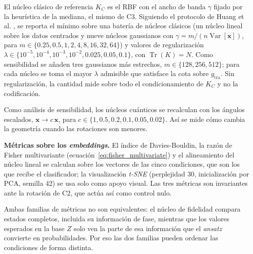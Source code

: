 El núcleo clásico de referencia $K_C$ es el RBF con el ancho de banda $\gamma$ fijado por la
heurística de la mediana, el mismo de C3. Siguiendo el protocolo de Huang et al. \cite{huang2021power},
se reporta el mínimo sobre una batería de núcleos clásicos (un núcleo lineal sobre los datos
centrados y nueve núcleos gaussianos con $\gamma = m/(n\operatorname{Var}[\mathbf{x}])$, para
$m\in\{0.25,0.5,1,2,4,8,16,32,64\}$) y valores de regularización
$\lambda\in\{10^{-5},10^{-4},10^{-3},10^{-2},0.025,0.05,0.1\}$, con $\operatorname{Tr}(K) = N$. Como
sensibilidad se añaden tres gaussianos más estrechos, $m\in\{128,256,512\}$;
para cada núcleo se toma el mayor $\lambda$ admisible que satisface la cota sobre $g_{\mathrm{tra}}$.
Sin regularización, la cantidad mide sobre todo el condicionamiento de $K_C$ y no la codificación.

Como análisis de sensibilidad, los núcleos cuánticos se recalculan con los ángulos escalados,
$\mathbf{x}\to c\,\mathbf{x}$, para $c \in \{1, 0.5, 0.2, 0.1, 0.05, 0.02\}$. Así se mide cómo cambia la
geometría cuando las rotaciones son menores.

\textbf{Métricas sobre los \textit{embeddings}.} El índice de Davies-Bouldin, la razón de
Fisher multivariante (ecuación~\eqref{eq:fisher_multivariate}) y el alineamiento del núcleo lineal se
calculan sobre los vectores de las cinco condiciones, que son los que recibe el
clasificador; la visualización \textit{t-SNE} (perplejidad 30, inicialización por PCA,
semilla 42) se usa solo como apoyo visual. Las tres métricas son invariantes ante la
rotación de C2, que actúa así como control nulo.

Ambas familias de métricas no son equivalentes: el núcleo de fidelidad compara estados
completos, incluida su información de fase, mientras que los valores esperados en la
base $Z$ solo ven la parte de esa información que el \textit{ansatz} convierte en probabilidades.
Por eso las dos familias pueden ordenar las condiciones de forma distinta.
